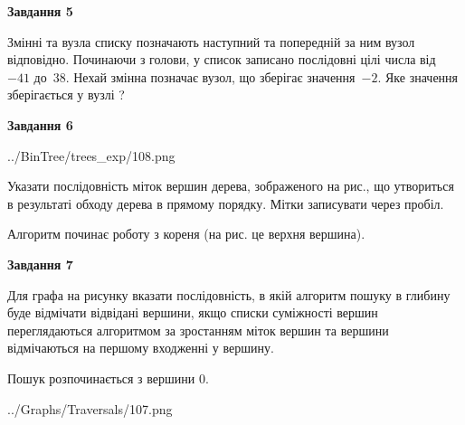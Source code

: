 \documentclass[12pt, ukrainian]{article}
\begin{document}
{\begin {large}
{\begin {center}\textbf{Завдання 5}\end {center}}\par
Змінні  та  вузла списку позначають наступний та попередній за ним вузол відповідно. Починаючи з голови, у список записано послідовні цілі числа від~$-41$ до~$38$. Нехай змінна  позначає вузол, що зберігає значення~$-2$.
Яке значення зберігається у вузлі  ?\par
\newpage

{\begin {center}\textbf{Завдання 6}\end {center}}\par

\begin{center}
	{../BinTree/trees_exp/108.png}
\end{center}
Указати послідовність міток вершин дерева, зображеного на рис., що утвориться в результаті обходу дерева в прямому порядку. Мітки записувати через пробіл.\par Алгоритм починає роботу з кореня (на рис. це верхня вершина).\par
\newpage

{\begin {center}\textbf{Завдання 7}\end {center}}\par
Для графа на рисунку вказати послідовність, в якій алгоритм пошуку в глибину буде відмічати відвідані вершини, якщо списки суміжності вершин переглядаються алгоритмом за зростанням міток вершин та вершини відмічаються на першому вход\-женні у вершину.\par
Пошук розпочинається з вершини 0.\par

\begin{center}
	{../Graphs/Traversals/107.png}
\end{center}\par
\newpage


\end{large}}
\end{document}
